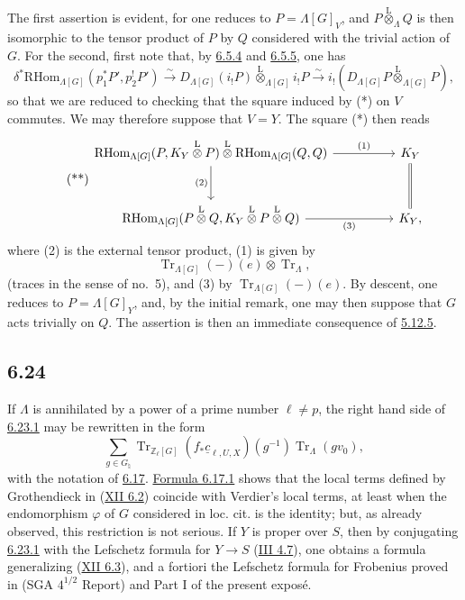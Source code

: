 \documentclass[11pt]{article}
\providecommand{\RHom}{\mathrm{RHom}}
\providecommand{\Tr}{\operatorname{Tr}}
\providecommand{\Tr}{\operatorname{Tr}}
\providecommand{\lten}{\overset{\mathrm L}{\otimes}}
\providecommand{\Tr}{\operatorname{Tr}}
\providecommand{\RHom}{\mathrm{RHom}}
\providecommand{\lten}{\overset{\mathrm L}{\otimes}}
\providecommand{\RHom}{\mathrm R\mathcal{H}om}
\providecommand{\lten}{\overset{\mathrm L}{\otimes}}
\providecommand{\Tr}{\operatorname{Tr}}
\providecommand{\lten}{\overset{\mathrm L}{\otimes}}
\providecommand{\lten}{\overset{\mathrm L}{\otimes}}
\providecommand{\lten}{\overset{\mathrm L}{\otimes}}
\providecommand{\RHom}{\mathrm{RHom}}
\providecommand{\Tr}{\operatorname{Tr}}
\providecommand{\lten}{\overset{\mathrm L}{\otimes}}
\begin{document}
The first assertion is evident, for one reduces to $P=\Lambda[G]_V$, and $P\lten_{\Lambda}Q$ is then isomorphic to the tensor product of $P$ by $Q$ considered with the trivial action of $G$. For the second, first note that, by \hyperref[sga5:IIIB:equation:6.5.4]{6.5.4} and \hyperref[sga5:IIIB:equation:6.5.5]{6.5.5}, one has
\[
\delta^*\RHom_{\Lambda[G]}(p_1^*P',p_2^!P')
\xrightarrow{\sim}
D_{\Lambda[G]}(i_!P)\lten_{\Lambda[G]} i_!P
\xrightarrow{\sim}
i_!(D_{\Lambda[G]}P\lten_{\Lambda[G]}P),
\]
so that we are reduced to checking that the square induced by (*) on $V$ commutes. We may therefore suppose that $V=Y$. The square (*) then reads
\begin{equation}\tag{**}\label{sga5:IIIB:equation:unnumbered:8}
\begin{tikzcd}[column sep=huge,row sep=large]
\RHom_{\Lambda[G]}(P,K_Y\lten P)\lten\RHom_{\Lambda[G]}(Q,Q) \arrow[r,"(1)"] \arrow[d,"(2)"']
& K_Y \arrow[d,equal]\\
\RHom_{\Lambda[G]}(P\lten Q,K_Y\lten P\lten Q) \arrow[r,"(3)"']
& K_Y ,
\end{tikzcd}
\end{equation}
where (2) is the external tensor product, (1) is given by
\[
\Tr_{\Lambda[G]}(-)(e)\otimes\Tr_{\Lambda},
\]
(traces in the sense of no.~5), and (3) by $\Tr_{\Lambda[G]}(-)(e)$. By descent, one reduces to $P=\Lambda[G]_Y$, and, by the initial remark, one may then suppose that $G$ acts trivially on $Q$. The assertion is then an immediate consequence of \hyperref[sga5:IIIB:equation:5.12.5]{5.12.5}.

\subsection*{6.24}\label{sga5:IIIB:subsection:6.24}
If $\Lambda$ is annihilated by a power of a prime number $\ell\ne p$, the right hand side of \hyperref[sga5:IIIB:equation:6.23.1]{6.23.1} may be rewritten in the form
\[
\sum_{g\in G_{\natural}}
\Tr_{\mathbb Z_{\ell}[G]}(f_*\underline c_{\ell,U,X})(g^{-1})
\Tr_{\Lambda}(gv_0),
\]
with the notation of \hyperref[sga5:IIIB:corollary:6.17]{6.17}. \hyperref[sga5:IIIB:equation:6.17.1]{Formula 6.17.1} shows that the local terms defined by Grothendieck in (\hyperref[sga5:XII:subsection:6.2]{XII 6.2}) coincide with Verdier's local terms, at least when the endomorphism $\varphi$ of $G$ considered in loc. cit. is the identity; but, as already observed, this restriction is not serious. If $Y$ is proper over $S$, then by conjugating \hyperref[sga5:IIIB:equation:6.23.1]{6.23.1} with the Lefschetz formula for $Y\to S$ (\hyperref[sga5:III:corollary:4.7]{III 4.7}), one obtains a formula generalizing (\hyperref[sga5:XII:subsection:6.3]{XII 6.3}), and a fortiori the Lefschetz formula for Frobenius proved in (SGA $4^{1/2}$ Report) and Part I of the present exposé.
\end{document}
